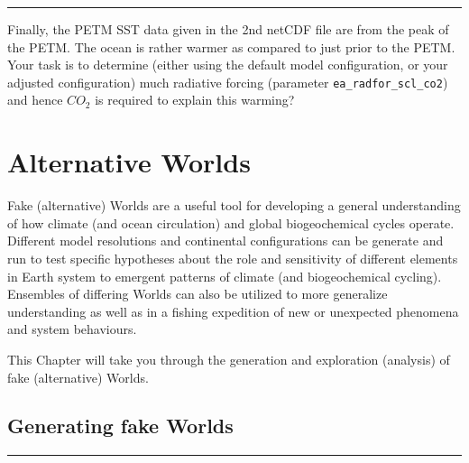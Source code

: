 \documentclass[11pt,fleqn]{book} %
\begin{document}
\vspace{1mm}
\noindent\rule{4cm}{0.1mm}
\vspace{2mm}

\noindent Finally, the PETM SST data given in the 2nd netCDF file are from the peak of the PETM. The ocean is rather warmer as compared to just prior to the PETM. Your task is to determine (either using the default model configuration, or your adjusted configuration) much radiative forcing (parameter \texttt{ea\_radfor\_scl\_co2}) and hence \(CO_{2}\) is required to explain this warming?


\cleardoublepage


\chapter{Alternative Worlds}

\hfill \break

\noindent Fake (alternative) Worlds are a useful tool for developing a general understanding of how climate (and ocean circulation) and global biogeochemical cycles operate. Different model resolutions and continental configurations can be generate and run to test specific hypotheses about the role and sensitivity of different elements in Earth system to emergent patterns of climate (and biogeochemical cycling). Ensembles of differing Worlds can also be utilized to more generalize understanding as well as in a fishing expedition of new or unexpected phenomena and system behaviours.

This Chapter will take you through the generation and exploration (analysis) of fake (alternative) Worlds.


\newpage

%
\section{Generating fake Worlds}


\vspace{1mm}
\noindent\rule{4cm}{0.5pt}
\vspace{2mm}
\end{document}
